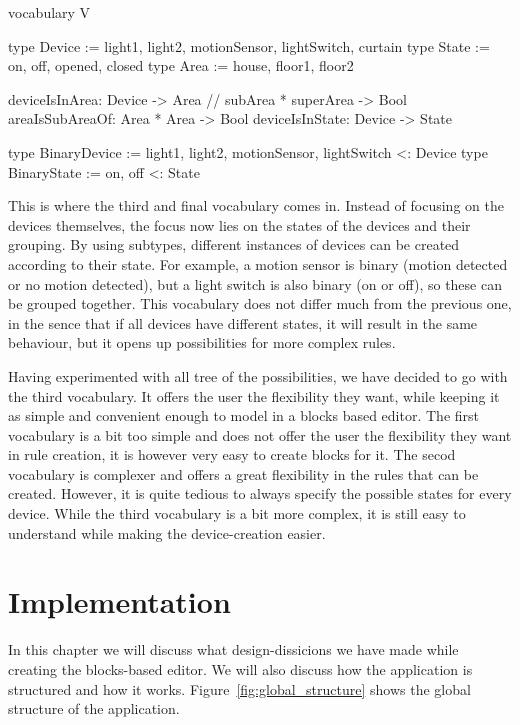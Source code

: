 \documentclass[11pt,a4paper]{report}
\begin{document}
\begin{idplisting}
vocabulary V {
    type Device := {light1, light2, motionSensor, lightSwitch, curtain}
    type State := {on, off, opened, closed}
    type Area := {house, floor1, floor2}

    deviceIsInArea: Device -> Area
    // subArea * superArea -> Bool
    areaIsSubAreaOf: Area * Area -> Bool
    deviceIsInState: Device -> State

    type BinaryDevice := {light1, light2, motionSensor, lightSwitch} <: Device
    type BinaryState := {on, off} <: State
}
\end{idplisting}

This is where the third and final vocabulary comes in. Instead of focusing on the devices themselves, the focus now lies on the states of the devices and their grouping. By using subtypes, different instances of devices can be created according to their state. For example, a motion sensor is binary (motion detected or no motion detected), but a light switch is also binary (on or off), so these can be grouped together. This vocabulary does not differ much from the previous one, in the sence that if all devices have different states, it will result in the same behaviour, but it opens up possibilities for more complex rules. 

Having experimented with all tree of the possibilities, we have decided to go with the third vocabulary. It offers the user the flexibility they want, while keeping it as simple and convenient enough to model in a blocks based editor. The first vocabulary is a bit too simple and does not offer the user the flexibility they want in rule creation, it is however very easy to create blocks for it. The secod vocabulary is complexer and offers a great flexibility in the rules that can be created. However, it is quite tedious to always specify the possible states for every device. While the third vocabulary is a bit more complex, it is still easy to understand while making the device-creation easier.

\chapter{Implementation}
In this chapter we will discuss what design-dissicions we have made while creating the blocks-based editor. We will also discuss how the application is structured and how it works. Figure~\ref{fig:global_structure} shows the global structure of the application.
\end{document}
